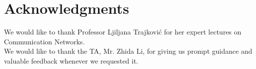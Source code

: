 \chapter*{Acknowledgments}

We would like to thank Professor Ljiljana Trajkovi\'{c} for her expert lectures on Communication Networks. \\
We would like to thank the TA, Mr. Zhida Li, for giving us prompt guidance and valuable feedback whenever we requested it.